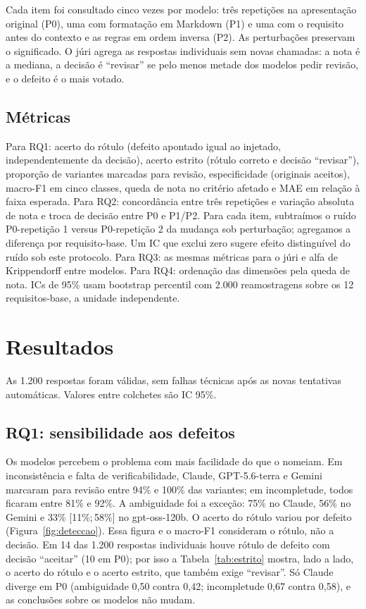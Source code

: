 \documentclass[12pt]{article}
\newcommand{\IC}[2]{[#1;\,#2]}
\begin{document}
Cada item foi consultado cinco vezes por modelo: três repetições na apresentação original (P0), uma com formatação em Markdown (P1) e uma com o requisito antes do contexto e as regras em ordem inversa (P2). As perturbações preservam o significado. O júri agrega as respostas individuais sem novas chamadas: a nota é a mediana, a decisão é ``revisar'' se pelo menos metade dos modelos pedir revisão, e o defeito é o mais votado.

\subsection{Métricas}

Para RQ1: acerto do rótulo (defeito apontado igual ao injetado, independentemente da decisão), acerto estrito (rótulo correto e decisão ``revisar''), proporção de variantes marcadas para revisão, especificidade (originais aceitos), macro-F1 em cinco classes, queda de nota no critério afetado e MAE em relação à faixa esperada. Para RQ2: concordância entre três repetições e variação absoluta de nota e troca de decisão entre P0 e P1/P2. Para cada item, subtraímos o ruído P0-repetição 1 versus P0-repetição 2 da mudança sob perturbação; agregamos a diferença por requisito-base. Um IC que exclui zero sugere efeito distinguível do ruído sob este protocolo. Para RQ3: as mesmas métricas para o júri e alfa de Krippendorff entre modelos. Para RQ4: ordenação das dimensões pela queda de nota. ICs de 95\% usam bootstrap percentil com 2.000 reamostragens sobre os 12 requisitos-base, a unidade independente.

\section{Resultados}

As 1.200 respostas foram válidas, sem falhas técnicas após as novas tentativas automáticas. Valores entre colchetes são IC 95\%.

\subsection{RQ1: sensibilidade aos defeitos}

Os modelos percebem o problema com mais facilidade do que o nomeiam. Em inconsistência e falta de verificabilidade, Claude, GPT-5.6-terra e Gemini marcaram para revisão entre 94\% e 100\% das variantes; em incompletude, todos ficaram entre 81\% e 92\%. A ambiguidade foi a exceção: 75\% no Claude, 56\% no Gemini e 33\% \IC{11\%}{58\%} no gpt-oss-120b. O acerto do rótulo variou por defeito (Figura~\ref{fig:deteccao}). Essa figura e o macro-F1 consideram o rótulo, não a decisão. Em 14 das 1.200 respostas individuais houve rótulo de defeito com decisão ``aceitar'' (10 em P0); por isso a Tabela~\ref{tab:estrito} mostra, lado a lado, o acerto do rótulo e o acerto estrito, que também exige ``revisar''. Só Claude diverge em P0 (ambiguidade 0,50 contra 0,42; incompletude 0,67 contra 0,58), e as conclusões sobre os modelos não mudam.
\end{document}
